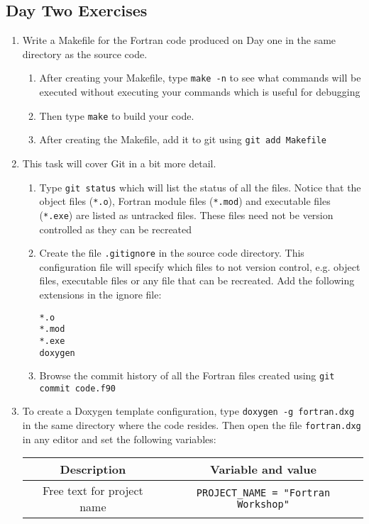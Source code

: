 \documentclass[12pt]{article}
\begin{document}
\subsection*{Day Two Exercises}
\begin{enumerate}
\item Write a Makefile for the Fortran code produced on Day one in the same directory as the source
code. 
\begin{enumerate}
\item After creating your Makefile, type \texttt{make -n} to see what commands will be executed without executing
your commands which is useful for debugging
\item Then type \texttt{make} to build your code. 
\item After creating the Makefile, add it to git using \texttt{git add Makefile}
\end{enumerate}
\item This task will cover Git in a bit more detail.
\begin{enumerate}
\item Type \texttt{git status} which will list the status of all the files. Notice that the object 
files (\texttt{*.o}), Fortran module files (\texttt{*.mod}) and executable files (\texttt{*.exe}) are listed as 
untracked files. These files need not be version controlled as they can be recreated
\item Create the file \texttt{.gitignore} in the source code directory. This configuration file will 
specify which files to not version control, e.g. object files, executable files or any file that can
be recreated. Add the following extensions in the ignore file:
\begin{verbatim}
*.o
*.mod
*.exe
doxygen
\end{verbatim}
\item Browse the commit history of all the Fortran files created using \texttt{git commit code.f90}
\end{enumerate}
\item To create a Doxygen template configuration, type \texttt{doxygen -g fortran.dxg} in the same
directory where the code resides. Then open the file \texttt{fortran.dxg} in any editor and set the 
following variables:
\begin{center}
\begin{tabular}{| c | c |} \hline
Description & Variable and value \\ \hline
Free text for project name & \texttt{PROJECT\_NAME = "Fortran Workshop"} \\ \hline

\end{tabular}
\end{center}
\end{enumerate}
\end{document}

